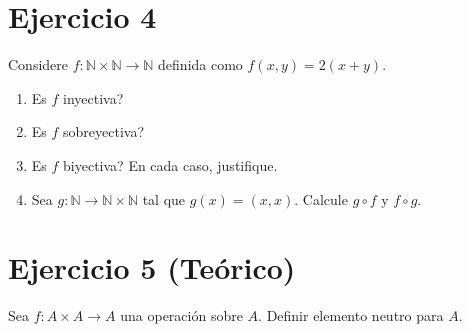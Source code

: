 \documentclass[12pt,a4paper]{article}
\begin{document}
\section*{Ejercicio 4}

Considere $f: \mathbb{N}\times\mathbb{N}\rightarrow\mathbb{N}$ definida
como $f(x,y)= 2(x+y)$.
\begin{enumerate}
\item Es $f$ inyectiva?
\item Es $f$ sobreyectiva?
\item Es $f$ biyectiva?
  En cada caso, justifique.

\item Sea $g :\mathbb{N}\rightarrow\mathbb{N}\times\mathbb{N}$ tal que
  $g(x) = (x,x)$. Calcule $g \circ f$ y $f \circ g$.
\end{enumerate}

\section*{Ejercicio 5 (Te\'orico)}
Sea $f : A\times A\rightarrow A$ una operaci\'on sobre $A$.
Definir elemento neutro para $A$.
\end{document}
